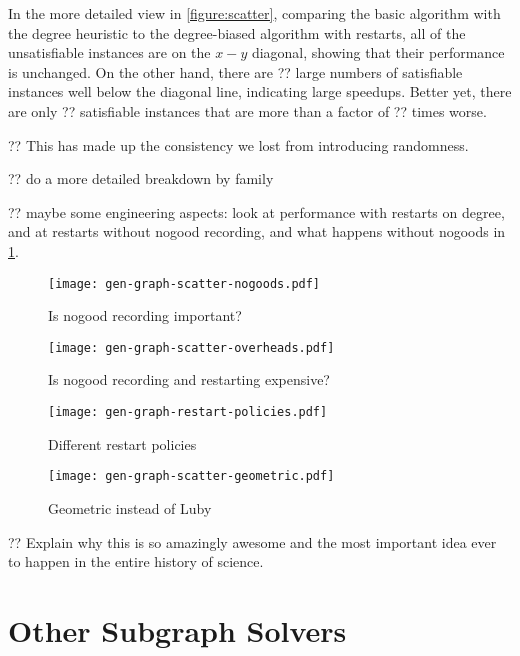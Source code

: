 \documentclass{article}
\begin{document}
In the more detailed view in \cref{figure:scatter}, comparing the basic algorithm with the degree
heuristic to the degree-biased algorithm with restarts, all of the unsatisfiable instances
are on the $x-y$ diagonal, showing that their performance is unchanged. On the other hand, there are
?? large numbers of satisfiable instances well below the diagonal line, indicating large speedups.
Better yet, there are only ?? satisfiable instances that are more than a factor of ?? times worse.

?? This has made up the consistency we lost from introducing randomness.

?? do a more detailed breakdown by family

?? maybe some engineering aspects: look at performance with restarts on degree, and at restarts
without nogood recording, and what happens without nogoods in \cref{figure:scatter-nogoods}.

\begin{figure}[tb]
    \centering
    \texttt{[image: gen-graph-scatter-nogoods.pdf]}

    \caption{Is nogood recording important?}
    \label{figure:scatter-nogoods}
\end{figure}

\begin{figure}[tb]
    \centering
    \texttt{[image: gen-graph-scatter-overheads.pdf]}

    \caption{Is nogood recording and restarting expensive?}
    \label{figure:scatter-overhead}
\end{figure}

\begin{figure}[tb]
    \centering
    \texttt{[image: gen-graph-restart-policies.pdf]}

    \caption{Different restart policies}
    \label{figure:restart-policies}
\end{figure}

\begin{figure}[tb]
    \centering
    \texttt{[image: gen-graph-scatter-geometric.pdf]}

    \caption{Geometric instead of Luby}
    \label{figure:scatter-geometric}
\end{figure}

?? Explain why this is so amazingly awesome and the most important idea ever to happen in the entire
history of science.

\section{Other Subgraph Solvers}
\end{document}
